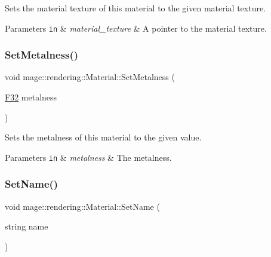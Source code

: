 Sets the material texture of this material to the given material texture.


\begin{DoxyParams}[1]{Parameters}
\mbox{\tt in}  & {\em material\+\_\+texture} & A pointer to the material texture. \\
\hline
\end{DoxyParams}
\mbox{\label{classmage_1_1rendering_1_1_material_a46b3297fb948c4fec3447caa35f96918}} 
\subsubsection{\texorpdfstring{Set\+Metalness()}{SetMetalness()}}
{\footnotesize\ttfamily void mage\+::rendering\+::\+Material\+::\+Set\+Metalness (\begin{DoxyParamCaption}\item[{\mbox{\hyperlink{namespacemage_aa97e833b45f06d60a0a9c4fc22ae02c0}{F32}}}]{metalness }\end{DoxyParamCaption})\hspace{0.3cm}{\ttfamily [noexcept]}}

Sets the metalness of this material to the given value.


\begin{DoxyParams}[1]{Parameters}
\mbox{\tt in}  & {\em metalness} & The metalness. \\
\hline
\end{DoxyParams}
\mbox{\label{classmage_1_1rendering_1_1_material_a5700b990bfd59c497e07ee6682ffbf06}} 
\subsubsection{\texorpdfstring{Set\+Name()}{SetName()}}
{\footnotesize\ttfamily void mage\+::rendering\+::\+Material\+::\+Set\+Name (\begin{DoxyParamCaption}\item[{string}]{name }\end{DoxyParamCaption})\hspace{0.3cm}{\ttfamily [noexcept]}}

